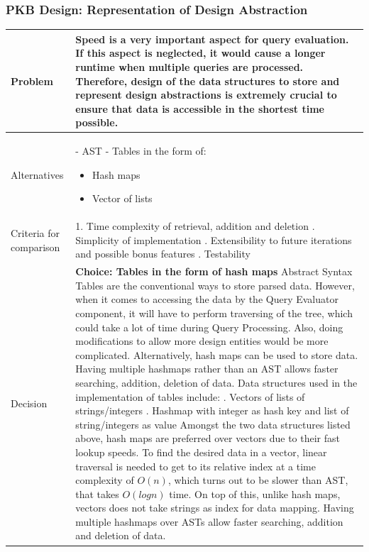 \documentclass[12pt]{article}
\begin{document}
{{{{{{{{{{{{{\subsubsection{PKB Design: Representation of Design Abstraction}
\begin{tabular}{|L{5cm} | L{12cm}| }
\hline
Problem &
Speed is a very important aspect for query evaluation. If this aspect is neglected, it would cause a longer runtime when multiple queries are processed. Therefore, design of the data structures to store and represent design abstractions is extremely crucial to ensure that data is accessible in the shortest time possible.
 \\
    \hline
    Alternatives &
- AST
\newline - Tables in the form of: \begin{itemize}
\item Hash maps
\item Vector of lists
\end{itemize} 
 \\
\hline
    Criteria for comparison &
1. Time complexity of retrieval, addition and deletion
. Simplicity of implementation 
. Extensibility to future iterations and possible bonus features
. Testability
 \\
 \hline
   Decision & \textbf{Choice: Tables in the form of hash maps}
\newline
Abstract Syntax Tables are the conventional ways to store parsed data. However, when it comes to accessing the data by the Query Evaluator component, it will have to perform traversing of the tree, which could take a lot of time during Query Processing. Also, doing modifications to allow more design entities would be more complicated. Alternatively, hash maps can be used to store data. Having multiple hashmaps rather than an AST allows faster searching, addition, deletion of data. 
\newline Data structures used in the implementation of tables include:
. Vectors of lists of strings/integers
. Hashmap with integer as hash key and list of string/integers as value \newline
Amongst the two data structures listed above, hash maps are preferred over vectors due to their fast lookup speeds. To find the desired data in a vector, linear traversal is needed to get to its relative index at a time complexity of $O(n)$, which turns out to be slower than AST, that takes $O(log n)$ time. On top of this, unlike hash maps, vectors does not take strings as index for data mapping. Having multiple hashmaps over ASTs allow faster searching, addition and deletion of data.


\end{tabular}}}}}}}}}}}}}}
\end{document}
